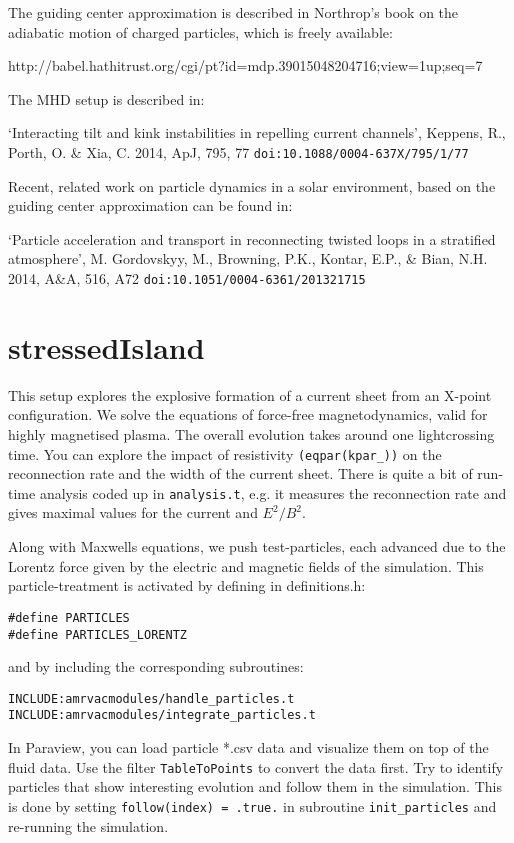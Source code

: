 \documentclass[10pt]{article}
\begin{document}
The guiding center approximation is described in Northrop's book on the adiabatic motion of charged particles, which is freely available:

http://babel.hathitrust.org/cgi/pt?id=mdp.39015048204716;view=1up;seq=7   

The MHD setup is described in:

`Interacting tilt and kink instabilities in repelling current channels', Keppens, R., Porth, O. \& Xia, C. 2014, ApJ, 795, 77 {\tt doi:10.1088/0004-637X/795/1/77 }

Recent, related work on particle dynamics in a solar environment, based on the guiding center approximation can be found in:

`Particle acceleration and transport in reconnecting twisted loops in a stratified atmosphere', M. Gordovskyy, M., Browning, P.K., Kontar, E.P., \& Bian, N.H. 2014, A\&A, 516, A72 {\tt doi:10.1051/0004-6361/201321715}


\section*{stressedIsland}

This setup explores the explosive formation of a current sheet from an X-point configuration.  We solve the equations of force-free magnetodynamics, valid for highly magnetised plasma.  The overall evolution takes around one lightcrossing time.  
You can explore the impact of resistivity {\tt (eqpar(kpar\_))} on the reconnection rate and the width of the current sheet.  
There is quite a bit of run-time analysis coded up in {\tt analysis.t}, e.g. it measures the reconnection rate and gives maximal values for the current and $E^2/B^2$.  

Along with Maxwells equations, we push test-particles, each advanced due to the Lorentz force given by the electric and magnetic fields of the simulation.  
This particle-treatment is activated by defining in definitions.h:\\
\begin{verbatim}
#define PARTICLES
#define PARTICLES_LORENTZ
\end{verbatim}

and by including the corresponding subroutines:
\begin{verbatim}
INCLUDE:amrvacmodules/handle_particles.t
INCLUDE:amrvacmodules/integrate_particles.t
\end{verbatim}

In Paraview, you can load particle *.csv data and visualize them on top of the fluid data.  Use the filter {\tt TableToPoints} to convert the data first.  
Try to identify particles that show interesting evolution and follow them in the simulation.  This is done by setting {\tt follow(index) = .true.} in subroutine {\tt init\_particles} and re-running the simulation.  
\end{document}
